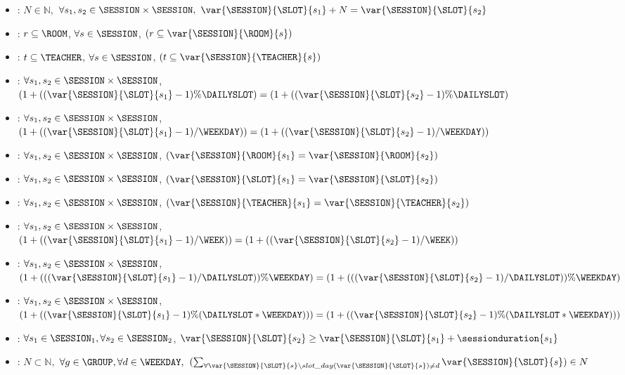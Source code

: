 \begin{itemize}
      \item \PERIODIC: $N \in \mathbb{N}, $ $\forall s_1,s_2 \in \SESSION \times \SESSION, $ $ \var{\SESSION}{\SLOT}{s_1}+N = \var{\SESSION}{\SLOT}{s_2} $
      
      \item \REQUIREDROOMS :  $ r \subseteq \ROOM $, $\forall s \in \SESSION $, $(r \subseteq \var{\SESSION}{\ROOM}{s})	$
      
      \item \REQUIREDTEACHERS :   $ t \subseteq \TEACHER $, $ \forall s \in \SESSION $, $(t \subseteq \var{\SESSION}{\TEACHER}{s})	$
      
      \item \SAMEDAILYSLOT  :  $\forall s_1, s_2 \in \SESSION \times \SESSION$, $(1+((\var{\SESSION}{\SLOT}{s_1}-1) \% \DAILYSLOT) = (1+((\var{\SESSION}{\SLOT}{s_2}-1) \% \DAILYSLOT )	$
      
      \item \SAMEDAY  :  $\forall s_1, s_2 \in \SESSION \times \SESSION$, $(1+((\var{\SESSION}{\SLOT}{s_1}-1) / \WEEKDAY   ))  = (1+((\var{\SESSION}{\SLOT}{s_2}-1) / \WEEKDAY   ))	$
     
      \item \SAMEROOMS :  $\forall s_1, s_2 \in \SESSION \times \SESSION$, $(\var{\SESSION}{\ROOM}{s_1}  = \var{\SESSION}{\ROOM}{s_2})	$
      \item \SAMESLOT  :  $\forall s_1, s_2 \in \SESSION \times \SESSION$, $(\var{\SESSION}{\SLOT}{s_1}  = \var{\SESSION}{\SLOT}{s_2})	$
      \item \SAMETEACHERS  :  $\forall s_1, s_2 \in \SESSION \times \SESSION$, $(\var{\SESSION}{\TEACHER}{s_1}  = \var{\SESSION}{\TEACHER}{s_2})	$
      \item \SAMEWEEK  :  $\forall s_1, s_2 \in \SESSION \times \SESSION$, $(1+((\var{\SESSION}{\SLOT}{s_1}-1) / \WEEK)) = (1+((\var{\SESSION}{\SLOT}{s_2}-1) / \WEEK))	$
      \item \SAMEWEEKDAY  :  $\forall s_1, s_2 \in \SESSION \times \SESSION$, $(1+(((\var{\SESSION}{\SLOT}{s_1}-1) / \DAILYSLOT)) \% \WEEKDAY)  = (1+(((\var{\SESSION}{\SLOT}{s_2}-1) / \DAILYSLOT)) \% \WEEKDAY)	$
      \item \SAMEWEEKLYSLOT  :  $\forall s_1, s_2 \in \SESSION \times \SESSION$, $(1+((\var{\SESSION}{\SLOT}{s_1}-1) \% (\DAILYSLOT * \WEEKDAY)))  = (1+((\var{\SESSION}{\SLOT}{s_2}-1) \% (\DAILYSLOT * \WEEKDAY)))	$
      \item \SEQUENCED  :  $\forall s_1 \in \SESSION_1,\forall s_2 \in \SESSION_2$, $ \var{\SESSION}{\SLOT}{s_2} \geq \var{\SESSION}{\SLOT}{s_1} + \sessionduration{s_1}	$
      \item \WORKLOAD : $ N \subset \mathbb{N}, $ $ \forall g \in \GROUP, \forall d \in \WEEKDAY, $ $( \sum_{\forall \var{\SESSION}{\SLOT}{s} \backslash slot\_day(\var{\SESSION}{\SLOT}{s}) \ne d } \var{\SESSION}{\SLOT}{s}) \in N$
      
      
      
      
  \end{itemize}


